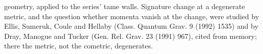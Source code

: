 geometry, applied to the series' tame walls. Signature change at a degenerate metric, and the question whether momenta vanish at the change, were studied by Ellis, Sumeruk, Coule and Hellaby (Class. Quantum Grav. 9 (1992) 1535) and by Dray, Manogue and Tucker (Gen. Rel. Grav. 23 (1991) 967), cited from memory; there the metric, not the cometric, degenerates.
